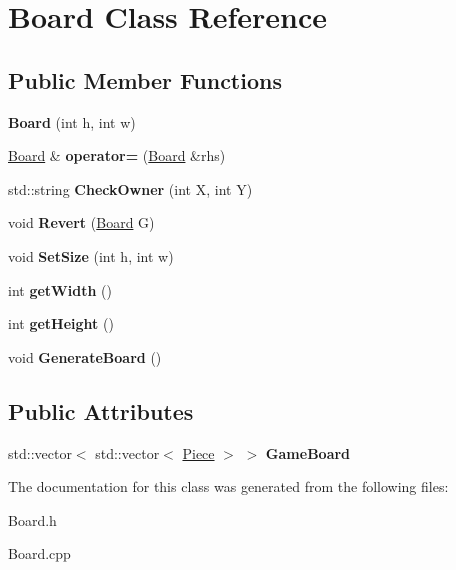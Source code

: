 \hypertarget{class_board}{\section{Board Class Reference}
\label{class_board}
}
\subsection*{Public Member Functions}
\begin{DoxyCompactItemize}
\item 
\hypertarget{class_board_a2a454606767ae96c22a728f3268b10fc}{{\bfseries Board} (int h, int w)}\label{class_board_a2a454606767ae96c22a728f3268b10fc}

\item 
\hypertarget{class_board_abe6ef93a03902a234b541130dab81366}{\hyperlink{class_board}{Board} \& {\bfseries operator=} (\hyperlink{class_board}{Board} \&rhs)}\label{class_board_abe6ef93a03902a234b541130dab81366}

\item 
\hypertarget{class_board_ab4b499dd0102694b8eb2f67f6717f9d3}{std\-::string {\bfseries Check\-Owner} (int X, int Y)}\label{class_board_ab4b499dd0102694b8eb2f67f6717f9d3}

\item 
\hypertarget{class_board_a5bef79c659946f9849a3d163f27e5191}{void {\bfseries Revert} (\hyperlink{class_board}{Board} G)}\label{class_board_a5bef79c659946f9849a3d163f27e5191}

\item 
\hypertarget{class_board_abbfb453ac45df0b5b1ca389c3edc3810}{void {\bfseries Set\-Size} (int h, int w)}\label{class_board_abbfb453ac45df0b5b1ca389c3edc3810}

\item 
\hypertarget{class_board_a67905f3b441a8605aeb50d8978415aa0}{int {\bfseries get\-Width} ()}\label{class_board_a67905f3b441a8605aeb50d8978415aa0}

\item 
\hypertarget{class_board_a14466e56568d523e5f4d0d695ccbcce1}{int {\bfseries get\-Height} ()}\label{class_board_a14466e56568d523e5f4d0d695ccbcce1}

\item 
\hypertarget{class_board_a9b90253fcbc77e78916f618c51558cc4}{void {\bfseries Generate\-Board} ()}\label{class_board_a9b90253fcbc77e78916f618c51558cc4}

\end{DoxyCompactItemize}
\subsection*{Public Attributes}
\begin{DoxyCompactItemize}
\item 
\hypertarget{class_board_ac512a2358f2828b75f86de08c7c5bd57}{std\-::vector$<$ std\-::vector$<$ \hyperlink{class_piece}{Piece} $>$ $>$ {\bfseries Game\-Board}}\label{class_board_ac512a2358f2828b75f86de08c7c5bd57}

\end{DoxyCompactItemize}


The documentation for this class was generated from the following files\-:\begin{DoxyCompactItemize}
\item 
Board.\-h\item 
Board.\-cpp\end{DoxyCompactItemize}
